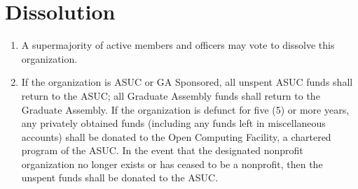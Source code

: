 \documentclass[english,a4paper]{article}
\begin{document}
\section{Dissolution}
\begin{enumerate}

\item
  A supermajority of active members and officers may vote to dissolve
  this organization.

\item
  If the organization is ASUC or GA Sponsored, all unspent ASUC funds
  shall return to the ASUC; all Graduate Assembly funds shall return
  to the Graduate Assembly. If the organization is defunct for five
  (5) or more years, any privately obtained funds (including any funds
  left in miscellaneous accounts) shall be donated to the Open Computing
  Facility, a chartered program of the ASUC. In the event that the designated
  nonprofit organization no longer exists or has ceased to be a nonprofit,
  then the unspent funds shall be donated to the ASUC.

\end{enumerate}
\end{document}
